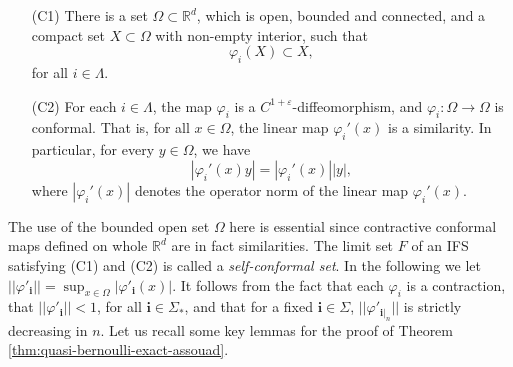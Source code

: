 \documentclass{PRM}
\newcommand{\field}[1]{\mathbb{#1}}
\newcommand{\R}{\field{R}}
\theoremstyle{plain}
\theoremstyle{definition}
\theoremstyle{remark}
\begin{document}
\begin{enumerate}
    \item[(C1)] There is a set $\Omega\subset \R^d$, which is open, bounded and connected, and a compact set $X\subset\Omega$ with non-empty interior, such that
    \begin{equation*}
        \varphi_{i}(X)\subset X,
    \end{equation*}
    for all $i\in\Lambda$.
    \item[(C2)] For each $i\in\Lambda$, the map $\varphi_i$ is a $C^{1+\varepsilon}$-diffeomorphism, and $\varphi_i\colon \Omega\to\Omega$ is conformal. That is, for all $x\in\Omega$, the linear map $\varphi_i'(x)$ is a similarity. In particular, for every $y\in \Omega$, we have
    \begin{equation*}
        |\varphi_i'(x)y|= |\varphi_i'(x)||y|,
    \end{equation*}
    where $|\varphi_i'(x)|$ denotes the operator norm of the linear map $\varphi_i'(x)$.
\end{enumerate}
The use of the bounded open set $\Omega$ here is essential since contractive conformal maps defined on whole $\R^d$ are in fact similarities. The limit set $F$ of an IFS satisfying (C1) and (C2) is called a \emph{self-conformal set}. In the following we let $||\varphi'_{\mathbf{i}}||=\sup_{x\in \Omega}|\varphi'_{\mathbf{i}}(x)|$. It follows from the fact that each $\varphi_i$ is a contraction, that $||\varphi'_{\mathbf{i}}||<1$, for all $\mathbf{i}\in\Sigma_*$, and that for a fixed $\mathbf{i}\in\Sigma$, $||\varphi'_{\mathbf{i}|_n}||$ is strictly decreasing in $n$. Let us recall some key lemmas for the proof of Theorem \ref{thm:quasi-bernoulli-exact-assouad}.
\end{document}
